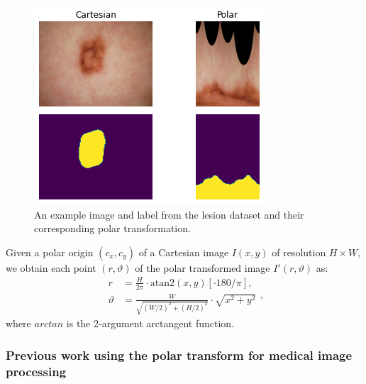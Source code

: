 	\begin{figure}[t!]
		\centering
		\includegraphics[width=0.4\linewidth]{images/4/to_polar}
		\caption{An example image and label from the lesion dataset and their corresponding polar transformation. \cite{bencevicTrainingPolarImage2021}}
		\label{fig:polar-lesion}
	\end{figure}

Given a polar origin $(c_x, c_y)$ of a Cartesian image $I(x, y)$ of resolution $H \times W$, we obtain each point $(r, \vartheta)$ of the polar transformed image $I'(r, \vartheta)$ as:
  \begin{equation}
    \begin{aligned}
      r &= \frac{H}{2 \pi} \cdot \mathrm{atan2}(x, y) [ \cdot 180 / \pi ], \\
      \vartheta &= \frac{W}{\sqrt{(W / 2)^2 + (H / 2)^2}} \cdot \sqrt{x^2 + y^2}
    \end{aligned},
    \label{eq:polar-transform}
  \end{equation}
  where $arctan$ is the 2-argument arctangent function.

    \subsubsection{Previous work using the polar transform for medical image processing}
    
